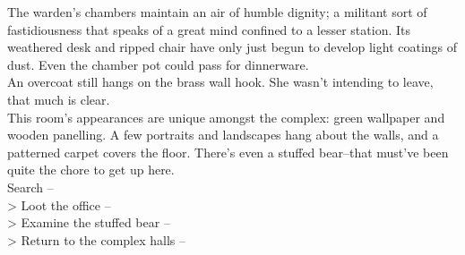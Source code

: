 The warden's chambers maintain an air of humble dignity; a militant sort of fastidiousness that speaks of a great mind confined to a lesser station. Its weathered desk and ripped chair have only just begun to develop light coatings of dust. Even the chamber pot could pass for dinnerware.\\

An overcoat still hangs on the brass wall hook. She wasn’t intending to leave, that much is clear.\\

This room's appearances are unique amongst the complex: green wallpaper and wooden panelling. A few portraits and landscapes hang about the walls, and a patterned carpet covers the floor. There’s even a stuffed bear--that must’ve been quite the chore to get up here.\\

 Search -- \\
> Loot the office -- \\
> Examine the stuffed bear -- \\
> Return to the complex halls -- 